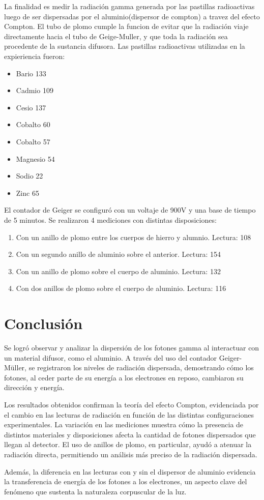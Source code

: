 \documentclass[a4paper,12pt]{report}
\begin{document}
    La finalidad es medir la radiación gamma generada por las pastillas radioactivas luego de ser dispersadas por el aluminio(dispersor de compton)
    a travez del efecto Compton. El tubo de plomo cumple la funcion de evitar que la radiación viaje directamente hacia el tubo de Geige-Muller, y
    que toda la radiación sea procedente de la sustancia difusora.
    Las pastillas radioactivas utilizadas en la expieriencia fueron:
    \begin{itemize}
        \item Bario 133
        \item Cadmio 109
        \item Cesio 137
        \item Cobalto 60
        \item Cobalto 57
        \item Magnesio 54
        \item Sodio 22
        \item Zinc 65
    \end{itemize}
    El contador de Geiger se configuró con un voltaje de 900V y una base de tiempo de 5 minutos.
    Se realizaron 4 mediciones con distintas disposiciones:
    \begin{enumerate}
        \item Con un anillo de plomo entre los cuerpos de hierro y alumnio. Lectura: 108
        \item Con un segundo anillo de aluminio sobre el anterior. Lectura: 154
        \item Con un anillo de plomo sobre el cuerpo de aluminio. Lectura: 132
        \item Con dos anillos de plomo sobre el cuerpo de aluminio. Lectura: 116
    \end{enumerate}
\chapter{Conclusión}

    Se logró observar y analizar la dispersión de los fotones
  gamma al interactuar con un material difusor, como el aluminio. A través del uso del contador Geiger-Müller, se
  registraron los niveles de radiación dispersada, demostrando cómo los fotones, al ceder parte de su energía a los
  electrones en reposo, cambiaron su dirección y energía.

  Los resultados obtenidos confirman la teoría del efecto Compton, evidenciada por el cambio en las lecturas de
  radiación en función de las distintas configuraciones experimentales. La variación en las mediciones muestra cómo la
  presencia de distintos materiales y disposiciones afecta la cantidad de fotones dispersados que llegan al detector.
  El uso de anillos de plomo, en particular, ayudó a atenuar la radiación directa, permitiendo un análisis más preciso
  de la radiación dispersada.

  Además, la diferencia en las lecturas con y sin el dispersor de aluminio evidencia la transferencia de energía de los
  fotones a los electrones, un aspecto clave del fenómeno que sustenta la naturaleza corpuscular de la luz.
\end{document}
